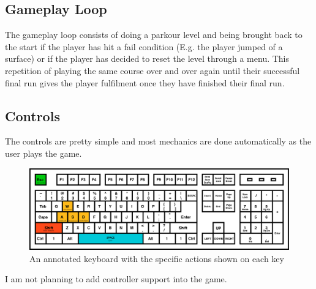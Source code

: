 \documentclass[12pt]{article}
\begin{document}
	\subsection{Gameplay Loop}
	The gameplay loop consists of doing a parkour level and being brought back to the start if the player has hit a fail condition (E.g. the player jumped of a surface) or if the player has decided to reset the level through a menu. This repetition of playing the same course over and over again until their successful final run gives the player fulfilment once they have finished their final run.
	\newpage
	\subsection{Controls}
	The controls are pretty simple and most mechanics are done automatically as the user plays the game.
	
	\begin{figure}[h]
		\includegraphics[scale=0.2]{keyboardLayout}
		\centering
		\caption{An annotated keyboard with the specific actions shown on each key}
	\end{figure}
	
	I am not planning to add controller support into the game.
	
\end{document}
